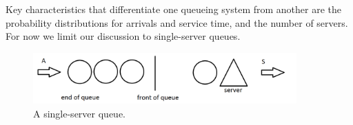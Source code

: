 Key characteristics that differentiate one queueing system from another are the probability distributions for arrivals and service time, and the number of servers.
For now we limit our discussion to single-server queues.

\vspace{0.5cm}
\begin{figure}[htbp]
	\centering
	\includegraphics[width=0.9\textwidth]{fig/4_queuepaint0.png}
	\caption{A single-server queue. \label{fig:4_queuepaint0}}
\end{figure}

\vspace{0.4cm}

\newpage

